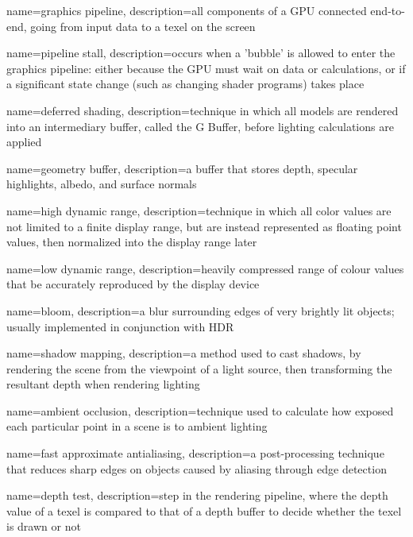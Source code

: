  {
  name=graphics pipeline,
  description={all components of a \gls{GPU} connected end-to-end, going from input data to a \gls{texel} on the screen}
}

 {
  name=pipeline stall,
  description={occurs when a 'bubble' is allowed to enter the \gls{graphics pipeline}: either because the \gls{GPU} must wait on data or calculations, or if a significant state change (such as changing \gls{shader} programs) takes place}
}

 {
  name=deferred shading,
  description={technique in which all models are rendered into an intermediary buffer, called the \gls{G Buffer}, before lighting calculations are applied}
}

 {
  name=geometry buffer,
  description={a buffer that stores depth, specular highlights, albedo, and surface normals}
}

 {
  name=high dynamic range,
  description={technique in which all color values are not limited to a finite display range, but are instead represented as \gls{floating point} values, then normalized into the display range later}
}

 {
  name=low dynamic range,
  description={heavily compressed range of colour values that be accurately reproduced by the display device}
}

 {
  name=bloom,
  description={a blur surrounding edges of very brightly lit objects; usually implemented in conjunction with \gls{HDR}}
}

 {
  name=shadow mapping,
  description={a method used to cast shadows, by rendering the scene from the viewpoint of a light source, then transforming the resultant depth when rendering lighting}
}

 {
  name=ambient occlusion,
  description={technique used to calculate how exposed each particular point in a scene is to ambient lighting}
}

 {
  name=fast approximate antialiasing,
  description={a post-processing technique that reduces sharp edges on objects caused by \gls{aliasing} through edge detection}
}

 {
  name=depth test,
  description={step in the rendering pipeline, where the depth value of a texel is compared to that of a depth buffer to decide whether the texel is drawn or not}
}

